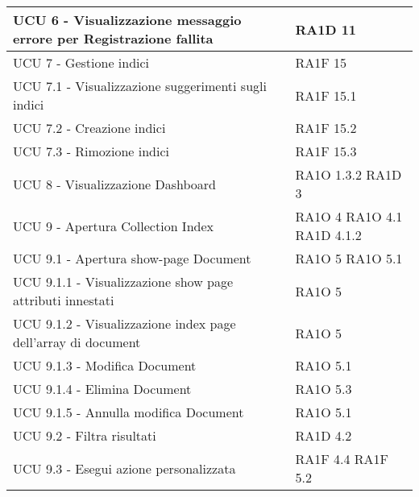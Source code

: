 \begin{center}
\begin{longtable}{ | p{5cm} | p{5cm} |}
            UCU 6 - Visualizzazione messaggio errore per Registrazione fallita &  RA1D 11 \newline  \\ \hline      
            UCU 7 - Gestione indici &  RA1F 15 \newline  \\ \hline      
            UCU 7.1 - Visualizzazione suggerimenti sugli indici &  RA1F 15.1 \newline  \\ \hline      
            UCU 7.2 - Creazione indici &  RA1F 15.2 \newline  \\ \hline      
            UCU 7.3  - Rimozione indici &  RA1F 15.3 \newline  \\ \hline      
            UCU 8 - Visualizzazione Dashboard &  RA1O 1.3.2 \newline  RA1D 3 \newline  \\ \hline      
            UCU 9 - Apertura Collection Index &  RA1O 4 \newline  RA1O 4.1 \newline  RA1D 4.1.2 \newline  \\ \hline      
            UCU 9.1 - Apertura show-page Document &  RA1O 5 \newline  RA1O 5.1 \newline  \\ \hline      
            UCU 9.1.1 - Visualizzazione show page attributi innestati &  RA1O 5 \newline  \\ \hline      
            UCU 9.1.2 - Visualizzazione index page dell'array di document &  RA1O 5 \newline  \\ \hline      
            UCU 9.1.3 - Modifica Document &  RA1O 5.1 \newline  \\ \hline      
            UCU 9.1.4 - Elimina Document &  RA1O 5.3 \newline  \\ \hline      
            UCU 9.1.5 - Annulla modifica Document &  RA1O 5.1 \newline  \\ \hline      
            UCU 9.2 - Filtra risultati &  RA1D 4.2 \newline  \\ \hline      
            UCU 9.3 - Esegui azione personalizzata &  RA1F 4.4 \newline  RA1F 5.2 \newline  \\ \hline      

\end{longtable}
\end{center}
